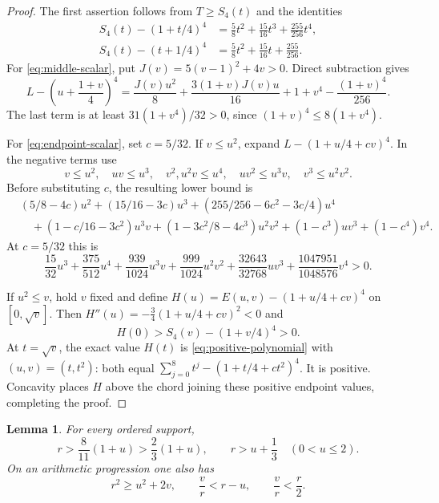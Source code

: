 \documentclass[11pt,a4paper]{article}
\newtheorem{lemma}[theorem]{Lemma}
\theoremstyle{remark}
\begin{document}
\begin{proof}
The first assertion follows from $T\ge S_4(t)$ and the identities
\begin{align*}
 S_4(t)-(1+t/4)^4&=\tfrac58t^2+\tfrac{15}{16}t^3+\tfrac{255}{256}t^4,\\
 S_4(t)-(t+1/4)^4&=\tfrac58t^2+\tfrac{15}{16}t+\tfrac{255}{256}.
\end{align*}
For \eqref{eq:middle-scalar}, put $J(v)=5(v-1)^2+4v>0$.
Direct subtraction gives
\[
 L-\left(u+\frac{1+v}{4}\right)^4
 =\frac{J(v)u^2}{8}+\frac{3(1+v)J(v)u}{16}
    +1+v^4-\frac{(1+v)^4}{256}.
\]
The last term is at least $31(1+v^4)/32>0$, since
$(1+v)^4\le8(1+v^4)$.

For \eqref{eq:endpoint-scalar}, set $c=5/32$. If $v\le u^2$, expand
$L-(1+u/4+cv)^4$. In the negative terms use
\[
 v\le u^2,\quad uv\le u^3,\quad v^2,u^2v\le u^4,
 \quad uv^2\le u^3v,\quad v^3\le u^2v^2.
\]
Before substituting $c$, the resulting lower bound is
\begin{align*}
 &(5/8-4c)u^2+(15/16-3c)u^3
 +(255/256-6c^2-3c/4)u^4\\
 &\quad +(1-c/16-3c^2)u^3v
 +(1-3c^2/8-4c^3)u^2v^2+(1-c^3)uv^3+(1-c^4)v^4.
\end{align*}
At $c=5/32$ this is
\begin{equation}\label{eq:positive-polynomial}
 \frac{15}{32}u^3+\frac{375}{512}u^4
 +\frac{939}{1024}u^3v+\frac{999}{1024}u^2v^2
 +\frac{32643}{32768}uv^3+\frac{1047951}{1048576}v^4>0.
\end{equation}

If $u^2\le v$, hold $v$ fixed and define
$H(u)=E(u,v)-(1+u/4+cv)^4$ on $[0,\sqrt v]$.
Then $H''(u)=-\tfrac34(1+u/4+cv)^2<0$ and
\[
 H(0)>S_4(v)-(1+v/4)^4>0.
\]
At $t=\sqrt v$, the exact value $H(t)$ is
\eqref{eq:positive-polynomial} with $(u,v)=(t,t^2)$:
both equal $\sum_{j=0}^8t^j-(1+t/4+ct^2)^4$.
It is positive. Concavity places $H$ above the chord joining these
positive endpoint values, completing the proof.
\end{proof}

\begin{lemma}\label{lem:middle-extras}
For every ordered support,
\begin{equation}\label{eq:binary-extra}
 r>\frac8{11}(1+u)>\frac23(1+u),
 \qquad r>u+\frac13\quad(0<u\le2).
\end{equation}
On an arithmetic progression one also has
\begin{equation}\label{eq:root-quadratic}
 r^2\ge u^2+2v,\qquad \frac vr<r-u,\qquad \frac vr<\frac r2.
\end{equation}
\end{lemma}
\end{document}
